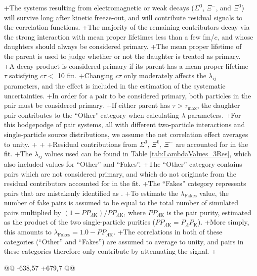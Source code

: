 +The systems resulting from electromagnetic or weak decays ($\Sigma^{0}$, $\Xi^{-}$, and $\Xi^{0}$) will survive long after kinetic freeze-out, and will contribute residual signals to the \LamK correlation functions.
+The majority of the remaining contributors decay via the strong interaction with mean proper lifetimes less than a few fm/$c$, and whose daughters should always be considered primary.
+The mean proper lifetime of the parent is used to judge whether or not the daughter is treated as primary.
+A decay product is considered primary if its parent has a mean proper lifetime $\tau$ satisfying $c\tau <$ 10 fm.
+Changing $c\tau$ only moderately affects the $\lambda_{ij}$ parameters, and the effect is included in the estimation of the systematic uncertainties.
+In order for a pair to be considered primary, both particles in the pair must be considered primary. 
+If either parent has $\tau > \tau_{\mathrm{max}}$, the daughter pair contributes to the ``Other" category when calculating $\lambda$ parameters.
+For this hodgepodge of pair systems, all with different two-particle interactions and single-particle source distributions, we assume the net correlation effect averages to unity.
+
+
+Residual contributions from $\Sigma^{0}$, $\Xi^{0}$, $\Xi^{-}$ are accounted for in the fit.
+The $\lambda_{ij}$ values used can be found in Table \ref{tab:LambdaValues_3Res}, which also included values for ``Other'' and ``Fakes''.  
+The ``Other'' category contains pairs which are not considered primary, and which do not originate from the residual contributors accounted for in the fit.  
+The ``Fakes'' category represents pairs that are mistakenly identified as \LamK.  
+To estimate the $\lambda_{\mathrm{Fakes}}$ value, the number of fake pairs is assumed to be equal to the total number of simulated pairs multiplied by $(1-PP_{\Lambda\mathrm{K}})/PP_{\Lambda\mathrm{K}}$, where $PP_{\Lambda\mathrm{K}}$ is the \LamK pair purity, estimated as the product of the two single-particle purities ($PP_{\Lambda\mathrm{K}} = P_{\Lambda}P_{\mathrm{K}}$).
+More simply, this amounts to $\lambda_{\mathrm{Fakes}} = 1.0-PP_{\Lambda\mathrm{K}}$.
+The correlations in both of these categories (``Other'' and ``Fakes'') are assumed to average to unity, and pairs in these categories therefore only contribute by attenuating the signal. 
+
 
 \begin{table}[htbp]
  \centering
@@ -638,57 +679,7 @@
  \label{tab:LambdaValues_3Res}
 \end{table}
 
